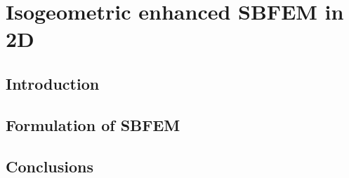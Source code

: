 
\chapter{Isogeometric enhanced SBFEM in 2D}
\section{Introduction}


\section{Formulation of SBFEM}



\section{Conclusions}